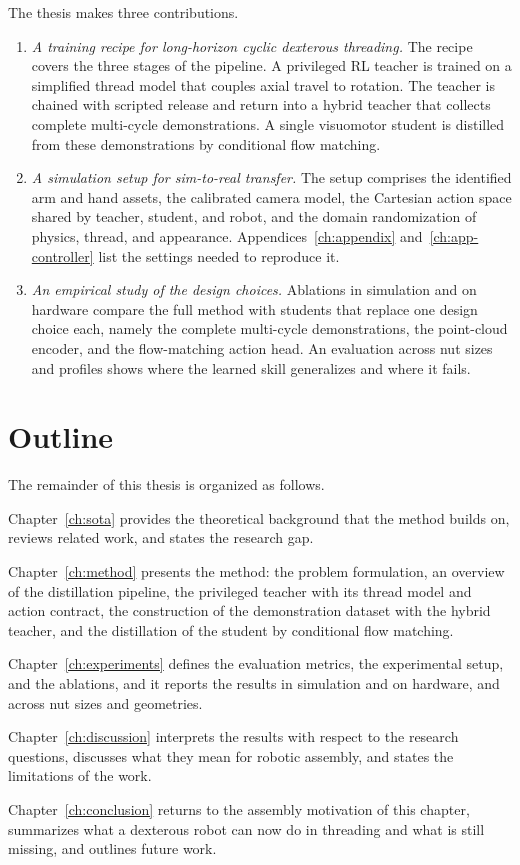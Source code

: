 The thesis makes three contributions.

\begin{enumerate}
  \item \emph{A training recipe for long-horizon cyclic dexterous threading.} The recipe covers the three stages of the pipeline. A privileged \ac{RL} teacher is trained on a simplified thread model that couples axial travel to rotation. The teacher is chained with scripted release and return into a hybrid teacher that collects complete multi-cycle demonstrations. A single visuomotor student is distilled from these demonstrations by conditional flow matching.
  \item \emph{A simulation setup for sim-to-real transfer.} The setup comprises the identified arm and hand assets, the calibrated camera model, the Cartesian action space shared by teacher, student, and robot, and the domain randomization of physics, thread, and appearance. Appendices~\ref{ch:appendix} and~\ref{ch:app-controller} list the settings needed to reproduce it.
  \item \emph{An empirical study of the design choices.} Ablations in simulation and on hardware compare the full method with students that replace one design choice each, namely the complete multi-cycle demonstrations, the point-cloud encoder, and the flow-matching action head. An evaluation across nut sizes and profiles shows where the learned skill generalizes and where it fails.
\end{enumerate}

\section{Outline}\label{sec:outline}

The remainder of this thesis is organized as follows.

Chapter~\ref{ch:sota} provides the theoretical background that the method builds on, reviews related work, and states the research gap.

Chapter~\ref{ch:method} presents the method: the problem formulation, an overview of the distillation pipeline, the privileged teacher with its thread model and action contract, the construction of the demonstration dataset with the hybrid teacher, and the distillation of the student by conditional flow matching.

Chapter~\ref{ch:experiments} defines the evaluation metrics, the experimental setup, and the ablations, and it reports the results in simulation and on hardware, and across nut sizes and geometries.

Chapter~\ref{ch:discussion} interprets the results with respect to the research questions, discusses what they mean for robotic assembly, and states the limitations of the work.

Chapter~\ref{ch:conclusion} returns to the assembly motivation of this chapter, summarizes what a dexterous robot can now do in threading and what is still missing, and outlines future work.

